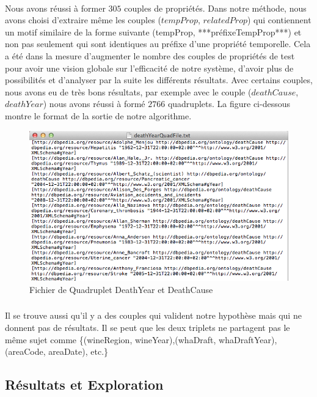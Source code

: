 \paragraph{}
Nous avons réussi à former $305$ couples de propriétés. Dans notre méthode, nous avons choisi d'extraire même les couples ($tempProp$, $relatedProp$) qui contiennent un motif similaire de la forme suivante (tempProp, ***préfixeTempProp***) et non pas seulement qui sont identiques au préfixe d'une propriété temporelle. Cela a été dans la mesure d'augmenter le nombre des couples de propriétés de test pour avoir une vision globale sur l'efficacité de notre système, d'avoir plus de possibilités et d'analyser par la suite les différents résultats. 
Avec certains couples, nous avons eu de très bons résultats, par exemple avec le couple ($deathCause$,$deathYear$) nous avons réussi à formé $2766$ quadruplets. La figure ci-dessous montre le format de la sortie de notre algorithme.
 \begin{figure}[H]
        \centering
                \includegraphics[width=15cm]{DeathYearCause.png}
               \caption{Fichier de Quadruplet DeathYear et DeathCause}
\end{figure}
\subparagraph{}
Il se trouve aussi qu'il y a des couples qui valident notre hypothèse mais qui ne donnent pas de résultats. Il se peut que les deux triplets ne partagent pas le même sujet comme \{(wineRegion, wineYear),(whaDraft, whaDraftYear),(areaCode, areaDate), etc.\}
\subsection{Résultats et Exploration}
